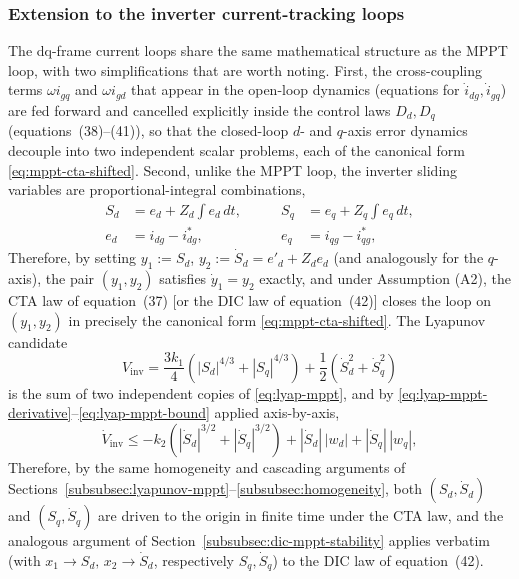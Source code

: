 \documentclass[preprint,12pt]{elsarticle}
\begin{document}
\subsubsection{Extension to the inverter current-tracking loops}
\label{subsubsec:inverter-stability}

The dq-frame current loops share the same mathematical structure as the MPPT loop, with two simplifications that are worth noting. First, the cross-coupling terms $\omega i_{gq}$ and $\omega i_{gd}$ that appear in the open-loop dynamics (equations for $\dot i_{dg}, \dot i_{gq}$) are fed forward and cancelled explicitly inside the control laws $D_d, D_q$ (equations~(38)--(41)), so that the closed-loop $d$- and $q$-axis error dynamics decouple into two independent scalar problems, each of the canonical form \eqref{eq:mppt-cta-shifted}. Second, unlike the MPPT loop, the inverter sliding variables are proportional-integral combinations,
\begin{equation}
\begin{aligned}
    S_d &= e_d + Z_d\!\int e_d\,dt, \qquad & S_q &= e_q + Z_q\!\int e_q\,dt, \\
    e_d &= i_{dg}-i^*_{dg}, \qquad & e_q &= i_{qg}-i^*_{qg},
\end{aligned}
    \label{eq:sd-sq-recall}
\end{equation}
Therefore, by setting $y_1:=S_d$, $y_2:=\dot S_d = e'_d+Z_de_d$ (and analogously for the $q$-axis), the pair $(y_1,y_2)$ satisfies $\dot y_1 = y_2$ exactly, and under Assumption (A2), the CTA law of equation~(37) [or the DIC law of equation~(42)] closes the loop on $(y_1,y_2)$ in precisely the canonical form \eqref{eq:mppt-cta-shifted}. The Lyapunov candidate
\begin{equation}
    V_{\text{inv}} = \frac{3k_1}{4}\left(|S_d|^{4/3}+|S_q|^{4/3}\right) + \frac{1}{2}\left(\dot S_d^2 + \dot S_q^2\right)
    \label{eq:lyap-inverter}
\end{equation}
is the sum of two independent copies of \eqref{eq:lyap-mppt}, and by \eqref{eq:lyap-mppt-derivative}--\eqref{eq:lyap-mppt-bound} applied axis-by-axis,
\begin{equation}
    \dot V_{\text{inv}} \leq -k_2\left(|\dot S_d|^{3/2}+|\dot S_q|^{3/2}\right) + |\dot S_d|\,|w_d| + |\dot S_q|\,|w_q|,
    \label{eq:lyap-inverter-derivative}
\end{equation}
Therefore, by the same homogeneity and cascading arguments of Sections~\ref{subsubsec:lyapunov-mppt}--\ref{subsubsec:homogeneity}, both $(S_d,\dot S_d)$ and $(S_q,\dot S_q)$ are driven to the origin in finite time under the CTA law, and the analogous argument of Section~\ref{subsubsec:dic-mppt-stability} applies verbatim (with $x_1\to S_d,\,x_2\to \dot S_d$, respectively $S_q,\dot S_q$) to the DIC law of equation~(42).
\end{document}

